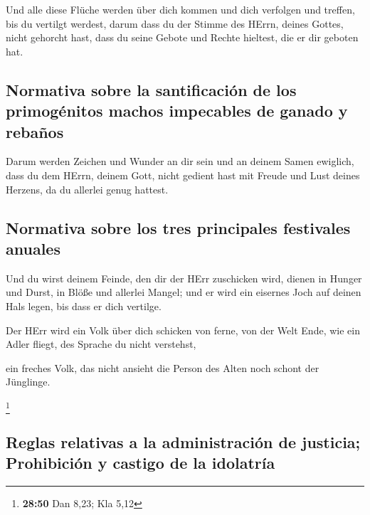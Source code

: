  Und alle diese Flüche werden über dich kommen und dich
verfolgen und treffen, bis du vertilgt werdest, darum dass du der Stimme
des HErrn, deines Gottes, nicht gehorcht hast, dass du seine Gebote und
Rechte hieltest, die er dir geboten hat.

\hypertarget{normativa-sobre-la-santificaciuxf3n-de-los-primoguxe9nitos-machos-impecables-de-ganado-y-rebauxf1os}{%
\subsection{Normativa sobre la santificación de los primogénitos machos
impecables de ganado y
rebaños}\label{normativa-sobre-la-santificaciuxf3n-de-los-primoguxe9nitos-machos-impecables-de-ganado-y-rebauxf1os}}

 Darum werden Zeichen und Wunder an dir sein und an
deinem Samen ewiglich,  dass du dem HErrn, deinem Gott,
nicht gedient hast mit Freude und Lust deines Herzens, da du allerlei
genug hattest.

\hypertarget{normativa-sobre-los-tres-principales-festivales-anuales}{%
\subsection{Normativa sobre los tres principales festivales
anuales}\label{normativa-sobre-los-tres-principales-festivales-anuales}}

 Und du wirst deinem Feinde, den dir der HErr zuschicken
wird, dienen in Hunger und Durst, in Blöße und allerlei Mangel; und er
wird ein eisernes Joch auf deinen Hals legen, bis dass er dich vertilge.

 Der HErr wird ein Volk über dich schicken von ferne, von
der Welt Ende, wie ein Adler fliegt, des Sprache du nicht verstehst,

 ein freches Volk, das nicht ansieht die Person des Alten
noch schont der Jünglinge.

\footnote{\textbf{28:50} Dan 8,23; Kla 5,12}

\hypertarget{reglas-relativas-a-la-administraciuxf3n-de-justicia-prohibiciuxf3n-y-castigo-de-la-idolatruxeda}{%
\subsection{Reglas relativas a la administración de justicia;
Prohibición y castigo de la
idolatría}\label{reglas-relativas-a-la-administraciuxf3n-de-justicia-prohibiciuxf3n-y-castigo-de-la-idolatruxeda}}

